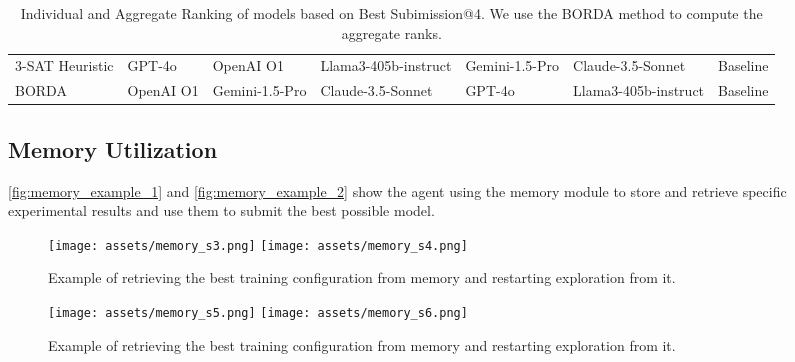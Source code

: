\begin{table}[!htb]
\begin{adjustbox}{width=\textwidth}
\begin{NiceTabular}{lllllll}
        3-SAT Heuristic & GPT-4o & OpenAI O1 & Llama3-405b-instruct & Gemini-1.5-Pro & Claude-3.5-Sonnet & Baseline \\
        BORDA & OpenAI O1 & Gemini-1.5-Pro & Claude-3.5-Sonnet & GPT-4o & Llama3-405b-instruct & Baseline \\
        \bottomrule
    \end{NiceTabular}
    \end{adjustbox}
    \caption{Individual and Aggregate Ranking of models based on Best Subimission@4. We use the BORDA method to compute the aggregate ranks.}
    \label{tab:bs_ranks}
\end{table}

\newpage

\subsection{Memory Utilization}
\label{sec:raw_results_appendix}
\autoref{fig:memory_example_1} and \autoref{fig:memory_example_2} show the agent using the memory module to store and retrieve specific experimental results and use them to submit the best possible model.

\begin{figure*}[!h]
    \centering
    \texttt{[image: assets/memory\_s3.png]}
    \vspace{-0.5pt}
    \texttt{[image: assets/memory\_s4.png]}
    \caption{Example of retrieving the best training configuration from memory and restarting exploration from it.}
    \label{fig:memory_example_1}
\end{figure*}
\begin{figure*}[!h]
    \centering
    \texttt{[image: assets/memory\_s5.png]}
    \vspace{-0.5pt}
    \texttt{[image: assets/memory\_s6.png]}
    \caption{Example of retrieving the best training configuration from memory and restarting exploration from it.}
    \label{fig:memory_example_2}
\end{figure*}
\newpage

